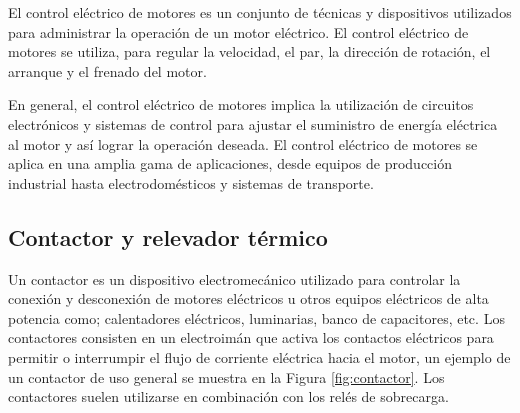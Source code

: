 El control eléctrico de motores es un conjunto de técnicas y dispositivos utilizados para administrar la operación de un motor eléctrico. El control eléctrico de motores se utiliza, para regular la velocidad, el par, la dirección de rotación, el arranque y el frenado del motor.

En general, el control eléctrico de motores implica la utilización de circuitos electrónicos y sistemas de control para ajustar el suministro de energía eléctrica al motor y así lograr la operación deseada. El control eléctrico de motores se aplica en una amplia gama de aplicaciones, desde equipos de producción industrial hasta electrodomésticos y sistemas de transporte.

\subsection{Contactor y relevador térmico}

Un contactor es un dispositivo electromecánico utilizado para controlar la conexión y desconexión de motores eléctricos u otros equipos eléctricos de alta potencia como; calentadores eléctricos, luminarias, banco de capacitores, etc. Los contactores consisten en un electroimán que activa los contactos eléctricos para permitir o interrumpir el flujo de corriente eléctrica hacia el motor, un ejemplo de un contactor de uso general se muestra en la Figura \ref{fig:contactor}. Los contactores suelen utilizarse en combinación con los relés de sobrecarga.


